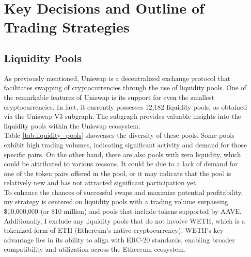 \chapter{Key Decisions and Outline of Trading Strategies}

\section{Liquidity Pools} \label{sec:liquidity-pools}
As previously mentioned, Uniswap is a decentralized exchange protocol that facilitates swapping of cryptocurrencies through the use of liquidity pools. One of the remarkable features of Uniswap is its support for even the smallest cryptocurrencies. In fact, it currently possesses 12,182 liquidity pools, as obtained via the Uniswap V3 subgraph. The subgraph provides valuable insights into the liquidity pools within the Uniswap ecosystem.
\\[5mm]
Table \ref{tab:liquidity_pools} showcases the diversity of these pools. Some pools exhibit high trading volumes, indicating significant activity and demand for those specific pairs. On the other hand, there are also pools with zero liquidity, which could be attributed to various reasons. It could be due to a lack of demand for one of the token pairs offered in the pool, or it may indicate that the pool is relatively new and has not attracted significant participation yet.
\\[5mm]
To enhance the chances of successful swaps and maximize potential profitability, my strategy is centered on liquidity pools with a trading volume surpassing \$10,000,000 (or \$10 million) and pools that include tokens supported by AAVE. Additionally, I exclude any liquidity pools that do not involve WETH, which is a tokenized form of ETH (Ethereum's native cryptocurrency). WETH's key advantage lies in its ability to align with ERC-20 standards, enabling broader compatibility and utilization across the Ethereum ecosystem.

